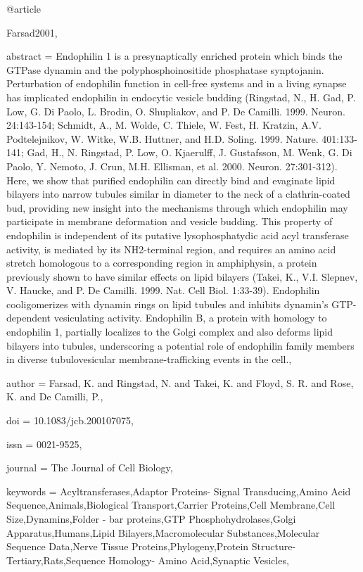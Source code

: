 @article{Farsad2001,

abstract = {Endophilin 1 is a presynaptically enriched protein which binds the GTPase dynamin and the polyphosphoinositide phosphatase synptojanin. Perturbation of endophilin function in cell-free systems and in a living synapse has implicated endophilin in endocytic vesicle budding (Ringstad, N., H. Gad, P. Low, G. Di Paolo, L. Brodin, O. Shupliakov, and P. De Camilli. 1999. Neuron. 24:143-154; Schmidt, A., M. Wolde, C. Thiele, W. Fest, H. Kratzin, A.V. Podtelejnikov, W. Witke, W.B. Huttner, and H.D. Soling. 1999. Nature. 401:133-141; Gad, H., N. Ringstad, P. Low, O. Kjaerulff, J. Gustafsson, M. Wenk, G. Di Paolo, Y. Nemoto, J. Crun, M.H. Ellisman, et al. 2000. Neuron. 27:301-312). Here, we show that purified endophilin can directly bind and evaginate lipid bilayers into narrow tubules similar in diameter to the neck of a clathrin-coated bud, providing new insight into the mechanisms through which endophilin may participate in membrane deformation and vesicle budding. This property of endophilin is independent of its putative lysophosphatydic acid acyl transferase activity, is mediated by its NH2-terminal region, and requires an amino acid stretch homologous to a corresponding region in amphiphysin, a protein previously shown to have similar effects on lipid bilayers (Takei, K., V.I. Slepnev, V. Haucke, and P. De Camilli. 1999. Nat. Cell Biol. 1:33-39). Endophilin cooligomerizes with dynamin rings on lipid tubules and inhibits dynamin's GTP-dependent vesiculating activity. Endophilin B, a protein with homology to endophilin 1, partially localizes to the Golgi complex and also deforms lipid bilayers into tubules, underscoring a potential role of endophilin family members in diverse tubulovesicular membrane-trafficking events in the cell.},

author = {Farsad, K. and Ringstad, N. and Takei, K. and Floyd, S. R. and Rose, K. and {De Camilli}, P.},

doi = {10.1083/jcb.200107075},

issn = {0021-9525},

journal = {The Journal of Cell Biology},

keywords = {Acyltransferases,Adaptor Proteins- Signal Transducing,Amino Acid Sequence,Animals,Biological Transport,Carrier Proteins,Cell Membrane,Cell Size,Dynamins,Folder - bar proteins,GTP Phosphohydrolases,Golgi Apparatus,Humans,Lipid Bilayers,Macromolecular Substances,Molecular Sequence Data,Nerve Tissue Proteins,Phylogeny,Protein Structure- Tertiary,Rats,Sequence Homology- Amino Acid,Synaptic Vesicles},

}
